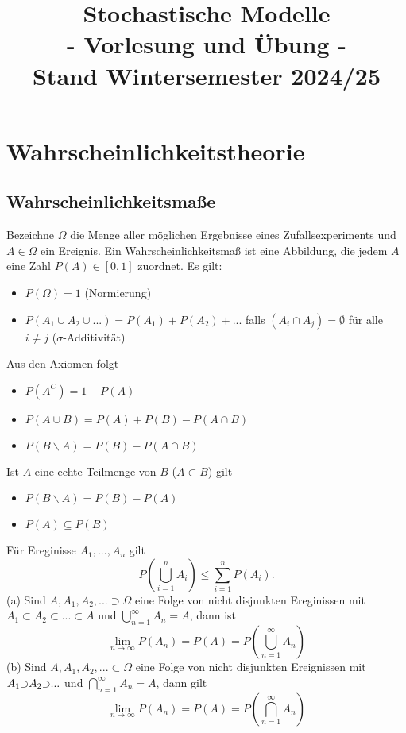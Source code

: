 \documentclass[a4paper,12pt]{article}
\title{\textbf{Stochastische Modelle} \\ \vspace{10pt} \normalsize - Vorlesung und Übung - \\ \vspace{10pt} \footnotesize Stand Wintersemester 2024/25}
\author{}
\date{}
\begin{document}
	
\maketitle
\newpage
	
\renewcommand{\contentsname}{Inhaltsverzeichnis}
\tableofcontents
\newpage
	
\section{Wahrscheinlichkeitstheorie}
\subsection{Wahrscheinlichkeitsmaße}
Bezeichne $\Omega$ die Menge aller möglichen Ergebnisse eines Zufallsexperiments und $A \in \Omega$ ein Ereignis. 
Ein Wahrscheinlichkeitsmaß ist eine Abbildung, die jedem $A$ eine Zahl $P(A) \in [0,1]$ zuordnet. Es gilt:
\begin{itemize}
\item $P(\Omega) = 1 $ (Normierung)
\item $P(A_1 \cup A_2 \cup ...) = P(A_1) + P(A_2) + ...$ falls $(A_i \cap A_j) = \emptyset$ für alle $i \neq j$ ($\sigma$-Additivität)
\end{itemize}
Aus den Axiomen folgt
\begin{itemize}
    \item $P(A^C) = 1- P(A)$
    \item $P(A \cup B) = P(A) + P(B) - P(A \cap B)$
    \item $P(B \backslash A) = P(B) - P(A\cap B)$
\end{itemize}
Ist $A$ eine echte Teilmenge von $B$ ($A \subset B$) gilt
\begin{itemize}
    \item $P(B \backslash A)= P(B) - P(A)$ 
    \item $P(A) \subseteq P(B)$
\end{itemize}
Für Ereginisse $A_1, ..., A_n$ gilt
$$
P \left( \bigcup_{i=1}^nA_i \right) \leq \sum_{i=1}^{n}P(A_i)
.$$
(a) Sind $A, A_1, A_2, ... \supset \Omega$ eine Folge von nicht disjunkten Ereginissen mit $A_1 \subset A_2 \subset ... \subset A$ und $\bigcup_{n=1}^\infty A_n = A$, dann ist
$$
\lim_{n \to \infty} P(A_n) = P(A) = P \left(  \bigcup_{n=1}^\infty A_n \right)
$$
(b) Sind $A, A_1, A_2, ... \subset \Omega$ eine Folge von nicht disjunkten Ereignissen mit $A_1 \reflectbox{$\subset$} A_2 \reflectbox{$\subset$} ...$ und $\bigcap_{n=1}^\infty A_n = A$, dann gilt 
$$
\lim_{n \to \infty} P(A_n) = P(A) = P \left(  \bigcap_{n=1}^\infty A_n \right)
$$
\end{document}

